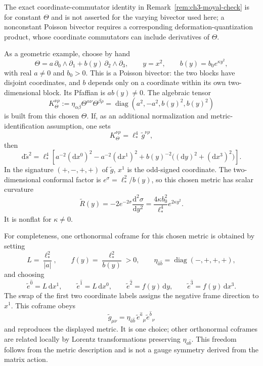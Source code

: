 \begin{remark}
  \label{rem:ch3-varying-theta}
The exact coordinate-commutator identity in
Remark~\ref{rem:ch3-moyal-check} is for constant \(\Theta\) and is
not asserted for the varying bivector used here; a nonconstant
Poisson bivector requires a corresponding deformation-quantization
product, whose coordinate commutators can include derivatives of
\(\Theta\).

As a geometric example, choose by hand
\[
  \Theta
  =a\,\partial_0\wedge\partial_1
   +b(y)\,\partial_2\wedge\partial_3,\qquad
  y=x^2,\qquad b(y)=b_0e^{\kappa y^2},
\]
with real \(a\ne0\) and \(b_0>0\). This is a Poisson bivector:
the two blocks have disjoint coordinates, and \(b\) depends only on a
coordinate within its own two-dimensional block. Its Pfaffian is
\(ab(y)\ne0\). The algebraic tensor
\[
  K_\Theta^{\nu\rho}
  :=\eta_{\alpha\beta}\Theta^{\alpha\nu}\Theta^{\beta\rho}
  =\operatorname{diag}(a^2,-a^2,b(y)^2,b(y)^2)
\]
is built from this chosen \(\Theta\). If, as an additional
normalization and metric-identification assumption, one sets
\[
  K_\Theta^{\nu\rho}
  =\ell_*^4\,\tilde g^{\nu\rho},
\]
then
\[
  \mathrm{d}\tilde s^2
  =\ell_*^4\left[
    a^{-2}(\mathrm{d}x^0)^2-a^{-2}(\mathrm{d}x^1)^2
    +b(y)^{-2}\bigl((\mathrm{d}y)^2+(\mathrm{d}x^3)^2\bigr)
  \right].
\]
In the signature \((+,-,+,+)\) of \(\tilde g\), \(x^1\) is the
odd-signed coordinate. The two-dimensional conformal factor is
\(e^\sigma=\ell_*^2/b(y)\), so this chosen metric has scalar
curvature
\[
  \tilde R(y)
  =-2e^{-2\sigma}\frac{\mathrm{d}^2\sigma}{\mathrm{d}y^2}
  =\frac{4\kappa b_0^2}{\ell_*^4}e^{2\kappa y^2}.
\]
It is nonflat for \(\kappa\ne0\).

For completeness, one orthonormal coframe for this chosen metric is
obtained by setting
\[
  L=\frac{\ell_*^2}{|a|},\qquad
  f(y)=\frac{\ell_*^2}{b(y)}>0,\qquad
  \eta_{\hat a\hat b}
  =\operatorname{diag}(-,+,+,+),
\]
and choosing
\[
  \tilde e^{\hat 0}=L\,\mathrm{d}x^1,\qquad
  \tilde e^{\hat 1}=L\,\mathrm{d}x^0,\qquad
  \tilde e^{\hat 2}=f(y)\,\mathrm{d}y,\qquad
  \tilde e^{\hat 3}=f(y)\,\mathrm{d}x^3.
\]
The swap of the first two coordinate labels assigns the negative
frame direction to \(x^1\). This coframe obeys
\[
  \tilde g_{\mu\nu}
  =\eta_{\hat a\hat b}\,
    \tilde e^{\hat a}{}_\mu\tilde e^{\hat b}{}_\nu
\]
and reproduces the displayed metric. It is one choice; other
orthonormal coframes are related locally by Lorentz transformations
preserving \(\eta_{\hat a\hat b}\). This freedom follows from the
metric description and is not a gauge symmetry derived from the
matrix action.


\end{remark}
